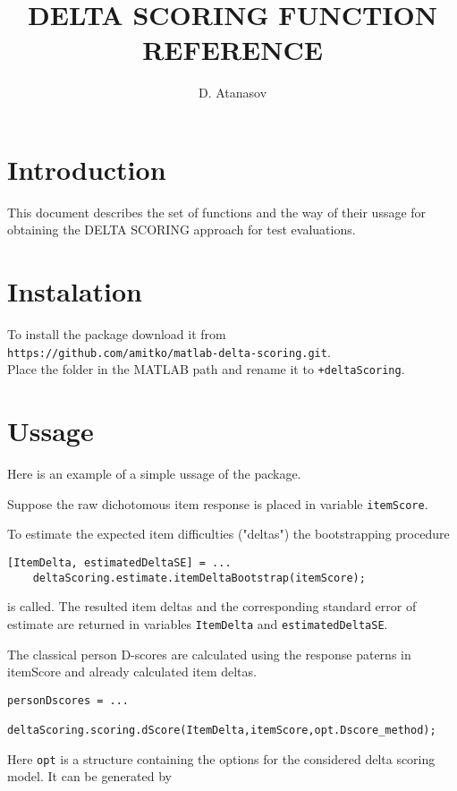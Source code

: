 \documentclass[12pt]{article}
\title{DELTA SCORING FUNCTION REFERENCE}
\author{D. Atanasov}
\begin{document}
\maketitle

\section{Introduction}
This document describes the set of functions and the way of their ussage for obtaining the DELTA SCORING approach for test evaluations.

\section{Instalation}
To install the package download it from \\
{\tt https://github.com/amitko/matlab-delta-scoring.git}. 
\\
Place the folder in the MATLAB path and rename it to {\tt +deltaScoring}.

\section{Ussage}
Here is an example of a simple ussage of the package.

Suppose the raw dichotomous item response is placed in variable {\tt itemScore}.

To estimate the expected item difficulties ("deltas") the bootstrapping procedure

\begin{lstlisting}[style=Matlab-bw]
[ItemDelta, estimatedDeltaSE] = ...
	deltaScoring.estimate.itemDeltaBootstrap(itemScore);
\end{lstlisting}

is called. The resulted item deltas and the corresponding standard error of estimate are returned in variables {\tt ItemDelta} and  {\tt estimatedDeltaSE}.

The classical person D-scores are calculated using the response paterns in itemScore and already calculated item deltas.

\begin{lstlisting}[style=Matlab-bw]
personDscores = ...
	deltaScoring.scoring.dScore(ItemDelta,itemScore,opt.Dscore_method);
\end{lstlisting}

Here {\tt opt} is a structure containing the options for the considered delta scoring model. It can be generated by
\end{document}
